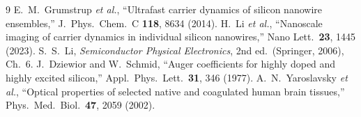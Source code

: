 \documentclass[11pt,a4paper]{article}
\begin{document}
\begin{thebibliography}{9}
 E.~M.~Grumstrup \textit{et al.}, ``Ultrafast carrier dynamics of silicon nanowire ensembles,'' J.\ Phys.\ Chem.\ C \textbf{118}, 8634 (2014).
 H.~Li \textit{et al.}, ``Nanoscale imaging of carrier dynamics in individual silicon nanowires,'' Nano Lett.\ \textbf{23}, 1445 (2023).
 S.~S.~Li, \textit{Semiconductor Physical Electronics}, 2nd ed.\ (Springer, 2006), Ch.~6.
 J.~Dziewior and W.~Schmid, ``Auger coefficients for highly doped and highly excited silicon,'' Appl.\ Phys.\ Lett.\ \textbf{31}, 346 (1977).
 A.~N.~Yaroslavsky \textit{et al.}, ``Optical properties of selected native and coagulated human brain tissues,'' Phys.\ Med.\ Biol.\ \textbf{47}, 2059 (2002).
\end{thebibliography}
\end{document}
